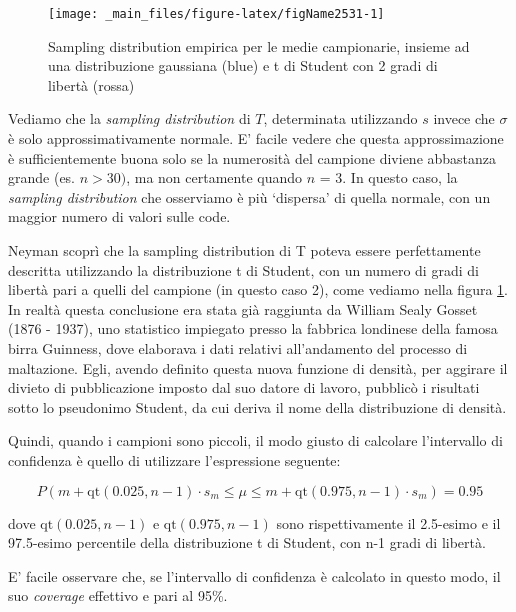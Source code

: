 \documentclass[a4paper,12pt,oneside]{book}
\begin{document}
\begin{figure}

{\centering \texttt{[image: \_main\_files/figure-latex/figName2531-1]} 

}

\caption{Sampling distribution empirica per le medie campionarie, insieme ad una distribuzione gaussiana (blue) e t di Student con 2 gradi di libertà (rossa)}\label{fig:figName2531}
\end{figure}

Vediamo che la \emph{sampling distribution} di \(T\), determinata utilizzando \(s\) invece che \(\sigma\) è solo approssimativamente normale. E' facile vedere che questa approssimazione è sufficientemente buona solo se la numerosità del campione diviene abbastanza grande (es. \(n > 30)\), ma non certamente quando \(n\) = 3. In questo caso, la \emph{sampling distribution} che osserviamo è più `dispersa' di quella normale, con un maggior numero di valori sulle code.

Neyman scoprì che la sampling distribution di T poteva essere perfettamente descritta utilizzando la distribuzione t di Student, con un numero di gradi di libertà pari a quelli del campione (in questo caso 2), come vediamo nella figura \ref{fig:figName2531}. In realtà questa conclusione era stata già raggiunta da William Sealy Gosset (1876 - 1937), uno statistico impiegato presso la fabbrica londinese della famosa birra Guinness, dove elaborava i dati relativi all'andamento del processo di maltazione. Egli, avendo definito questa nuova funzione di densità, per aggirare il divieto di pubblicazione imposto dal suo datore di lavoro, pubblicò i risultati sotto lo pseudonimo Student, da cui deriva il nome della distribuzione di densità.

Quindi, quando i campioni sono piccoli, il modo giusto di calcolare l'intervallo di confidenza è quello di utilizzare l'espressione seguente:

\[P \left( m + \textrm{qt}(0.025,n - 1) \cdot s_m \le \mu  \le m + \textrm{qt}(0.975,n - 1) \cdot s_m \right) = 0.95\]

dove \(\textrm{qt}(0.025,n - 1)\) e \(\textrm{qt}(0.975,n - 1)\) sono rispettivamente il 2.5-esimo e il 97.5-esimo percentile della distribuzione t di Student, con n-1 gradi di libertà.

E' facile osservare che, se l'intervallo di confidenza è calcolato in questo modo, il suo \emph{coverage} effettivo e pari al 95\%.
\end{document}
